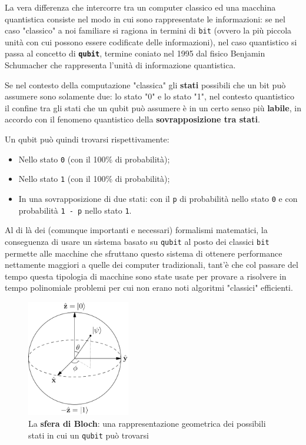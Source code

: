 \documentclass[a4paper, 12pt, oneside]{article}
\theoremstyle{definition}
\begin{document}
La vera differenza che intercorre tra un computer classico ed una macchina quantistica consiste nel modo in cui sono rappresentate le informazioni: se nel caso "classico" a noi familiare si ragiona in termini di \texttt{bit} (ovvero la più piccola unità con cui possono essere codificate delle informazioni), nel caso quantistico si passa al concetto di \texttt{\textbf{qubit}}, termine coniato nel 1995 \cite{PhysRevA.51.2738} dal fisico Benjamin Schumacher che rappresenta l'unità di informazione quantistica. 

Se nel contesto della computazione "classica" gli \textbf{stati} possibili che un bit può assumere sono solamente due: lo stato "0" e lo stato "1", nel contesto quantistico il confine tra gli stati che un qubit può assumere è in un certo senso più \textbf{labile}, in accordo con il fenomeno quantistico della \textbf{sovrapposizione tra stati}.

Un qubit può quindi trovarsi rispettivamente:

\begin{itemize}
    \item Nello stato \texttt{0} (con il 100\% di probabilità);
    \item Nello stato \texttt{1} (con il 100\% di probabilità);
    \item In una sovrapposizione di due stati: con il \texttt{p} di probabilità nello stato \texttt{0} e con probabilità \texttt{1 - p} nello stato \texttt{1}.
\end{itemize}

Al di là dei (comunque importanti e necessari) formalismi matematici, la conseguenza di usare un sistema basato su \texttt{qubit} al posto dei classici \texttt{bit} permette alle macchine che sfruttano questo sistema di ottenere performance nettamente maggiori a quelle dei computer tradizionali, tant'è che col passare del tempo questa tipologia di macchine sono state usate per provare a risolvere in tempo polinomiale problemi per cui non erano noti algoritmi "classici" efficienti.

\begin{figure}[H]
    \centering
    \includegraphics[width=0.4\textwidth]{images/1280px-Bloch_Sphere.svg.png}
    \caption{La \textbf{sfera di Bloch}: una rappresentazione geometrica dei possibili stati in cui un \texttt{qubit} può trovarsi}
\end{figure}
\end{document}
